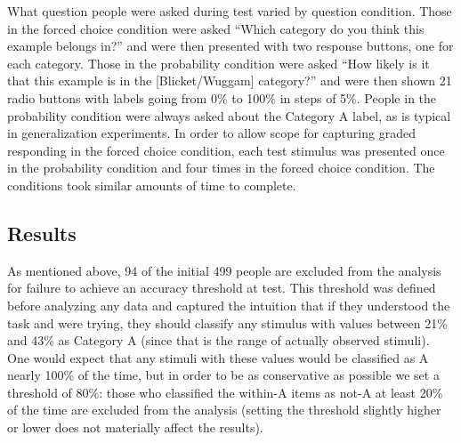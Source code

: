 \documentclass[doc,apacite]{apa6}
\begin{document}
What question people were asked during test varied by question condition. Those in the {\sc forced choice} condition were asked ``Which category do you think this example belongs in?'' and were then presented with two response buttons, one for each category. Those in the {\sc probability} condition were asked ``How likely is it that this example is in the [Blicket/Wuggam] category?'' and were then shown 21 radio buttons with labels going from 0\% to 100\% in steps of 5\%. People in the {\sc probability} condition were always asked about the Category A label, as is typical in generalization experiments. In order to allow scope for capturing graded responding in the {\sc forced choice} condition, each test stimulus was presented once in the {\sc probability} condition and four times in the {\sc forced choice} condition. The conditions took similar amounts of time to complete. 



\subsection{Results}

As mentioned above, 94 of the initial 499 people are excluded from the analysis for failure to achieve an accuracy threshold at test. This threshold was defined before analyzing any data and captured the intuition that if they understood the task and were trying, they should classify any stimulus with values between 21\% and 43\% as Category A (since that is the range of actually observed stimuli). One would expect that any stimuli with these values would be classified as A nearly 100\% of the time, but in order to be as conservative as possible we set a threshold of 80\%: those who classified the within-A items as not-A at least 20\% of the time are excluded from the analysis (setting the threshold slightly higher or lower does not materially affect the results). 
\end{document}
